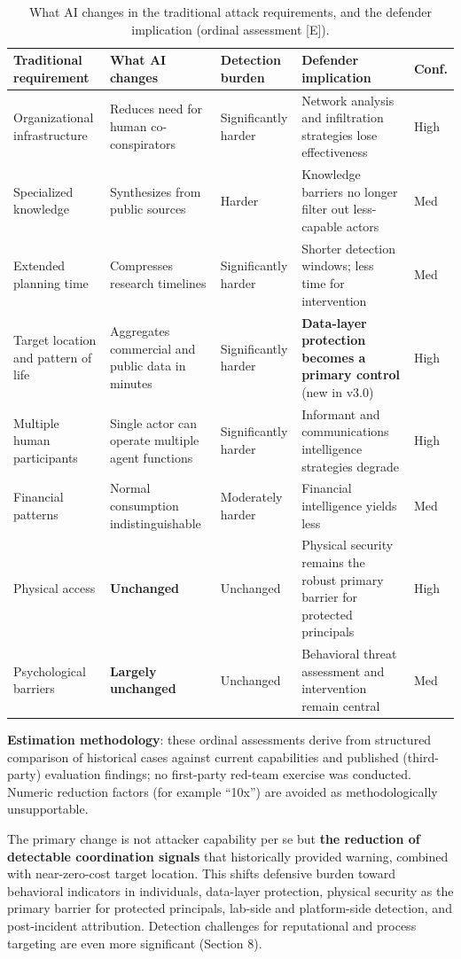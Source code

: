 \documentclass[11pt,letterpaper]{article}
\begin{document}
\begin{table}[!htbp]
\caption{What AI changes in the traditional attack requirements, and the defender implication (ordinal assessment [E]).}
\label{tab:detection}
\centering
\footnotesize
\begin{tabular}{L{2.9cm}L{3.6cm}L{2.1cm}L{5.2cm}l}
\toprule
\textbf{Traditional requirement} & \textbf{What AI changes} & \textbf{Detection burden} & \textbf{Defender implication} & \textbf{Conf.} \\
\midrule
Organizational infrastructure & Reduces need for human co-conspirators & Significantly harder & Network analysis and infiltration strategies lose effectiveness & High \\
Specialized knowledge & Synthesizes from public sources & Harder & Knowledge barriers no longer filter out less-capable actors & Med \\
Extended planning time & Compresses research timelines & Significantly harder & Shorter detection windows; less time for intervention & Med \\
Target location and pattern of life & Aggregates commercial and public data in minutes & Significantly harder & \textbf{Data-layer protection becomes a primary control} (new in v3.0) & High \\
Multiple human participants & Single actor can operate multiple agent functions & Significantly harder & Informant and communications intelligence strategies degrade & High \\
Financial patterns & Normal consumption indistinguishable & Moderately harder & Financial intelligence yields less & Med \\
Physical access & \textbf{Unchanged} & Unchanged & Physical security remains the robust primary barrier for protected principals & High \\
Psychological barriers & \textbf{Largely unchanged} & Unchanged & Behavioral threat assessment and intervention remain central & Med \\
\bottomrule
\end{tabular}
\end{table}

\textbf{Estimation methodology}: these ordinal assessments derive from structured comparison of historical cases against current capabilities and published (third-party) evaluation findings; no first-party red-team exercise was conducted. Numeric reduction factors (for example ``10x'') are avoided as methodologically unsupportable.

\begin{recbox}
The primary change is not attacker capability per se but \textbf{the reduction of detectable coordination signals} that historically provided warning, combined with near-zero-cost target location. This shifts defensive burden toward behavioral indicators in individuals, data-layer protection, physical security as the primary barrier for protected principals, lab-side and platform-side detection, and post-incident attribution. Detection challenges for reputational and process targeting are even more significant (Section 8).
\end{recbox}
\end{document}
